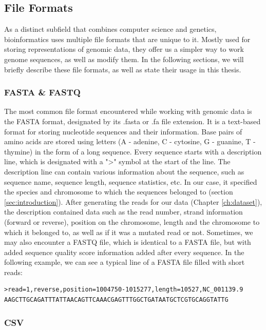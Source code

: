 \documentclass[times, utf8, diplomski, english]{fer_eng}
\begin{document}
\subsection{File Formats}
\label{subsec:file formats}

As a distinct subfield that combines computer science and genetics, bioinformatics uses multiple file formats that are unique to it. Mostly used for storing representations of genomic data, they offer us a simpler way to work genome sequences, as well as modify them. In the following sections, we will briefly describe these file formats, as well as state their usage in this thesis.

\subsubsection{FASTA \& FASTQ}
\label{subsubsec:fasta and fastq}

The most common file format encountered while working with genomic data is the FASTA format, designated by its .fasta or .fa file extension. It is a text-based format for storing nucleotide sequences and their information. Base pairs of amino acids are stored using letters (A - adenine, C - cytosine, G - guanine, T - thymine) in the form of a long sequence. Every sequence starts with a description line, which is designated with a ">" symbol at the start of the line. The description line can contain various information about the sequence, such as sequence name, sequence length, sequence statistics, etc. In our case, it specified the species and chromosome to which the sequences belonged to (section \ref{sec:introduction}). After generating the reads for our data (Chapter \ref{ch:dataset}), the description contained data such as the read number, strand information (forward or reverse), position on the chromosome, length and the chromosome to which it belonged to, as well as if it was a mutated read or not. Sometimes, we may also encounter a FASTQ file, which is identical to a FASTA file, but with added sequence quality score information added after every sequence. In the following example, we can see a typical line of a FASTA file filled with short reads:

\begin{lstlisting}
>read=1,reverse,position=1004750-1015277,length=10527,NC_001139.9
AAGCTTGCAGATTTATTAACAGTTCAAACGAGTTTGGCTGATAATGCTCGTGCAGGTATTG
\end{lstlisting}

\subsubsection{CSV}
\label{subsubsec:csv}
\end{document}
